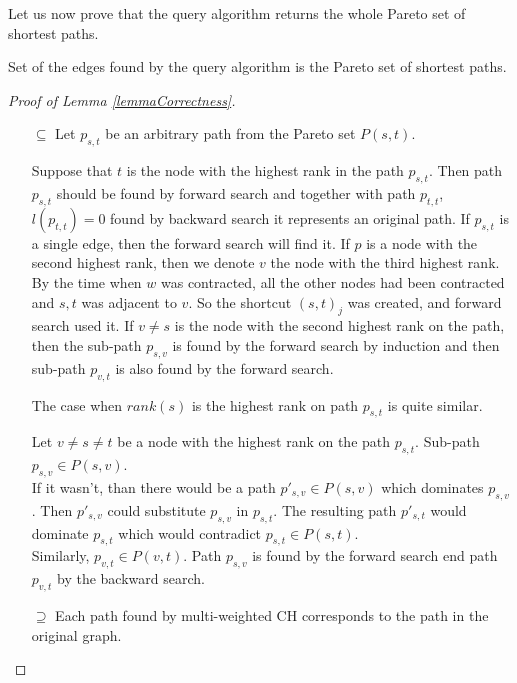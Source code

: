 Let us now prove that the query algorithm returns the whole Pareto set of shortest paths.

\begin{lemma}\label{lemmaCorrectness}
Set of the edges found by the query algorithm is the Pareto set of shortest paths.
\end{lemma}
\begin{proof}[Proof of Lemma \ref{lemmaCorrectness}]
\ \\ 
\begin{itemize}
\item[$\subseteq$] 
Let $p_{s,t}$ be an arbitrary path from the Pareto set $P(s,t)$. 

Suppose that $t$ is the node with the highest rank in the path $p_{s,t}$. 
Then path $p_{s,t}$ should be found by forward search
and together with path $p_{t,t}$, $l(p_{t,t})=0$ 
found by backward search it represents an original path.
If $p_{s,t}$ is a single edge, then the forward search will find it.
If $p$ is a node with the second highest rank, then we denote $v$ the
node with the third highest rank. 
By the time when $w$ was contracted, all the other nodes had been contracted
and $s,t$ was adjacent to $v$. So the shortcut $(s,t)_j$ was created, and forward search used it.
If $v \ne s$ is the node with the second highest rank on the path,
then the sub-path $p_{s,v}$ is found by the forward search by induction and
then sub-path $p_{v,t}$ is also found by the forward search.

The case when $rank(s)$ is the highest rank on path $p_{s,t}$ is quite similar. 

Let $v \ne s \ne t$ be a node with the highest rank on the path $p_{s,t}$. 
Sub-path $p_{s,v} \in P(s,v)$.\\ 
If it wasn't, than there would be a path $p'_{s,v} \in P(s,v)$ which dominates $p_{s,v}$. 
Then $p'_{s,v}$ could substitute $p_{s,v}$ in $p_{s,t}$. The resulting path $p'_{s,t}$ 
would dominate $p_{s,t}$ which would contradict $p_{s,t} \in P(s,t)$.\\
Similarly, $p_{v,t} \in P(v,t) $. Path $p_{s,v}$ is found by the forward search end path
$p_{v,t}$ by the backward search.
\item[$\supseteq$] 
Each path found by multi-weighted CH corresponds to the path in the original graph. 

\end{itemize}
\end{proof}

